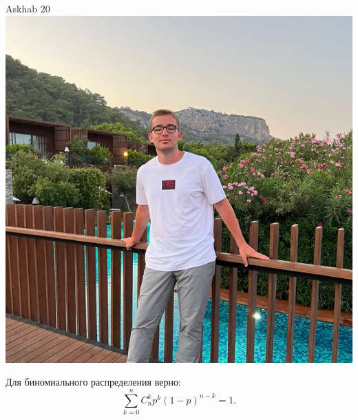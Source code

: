 \documentclass[12pt]{article}
\begin{document}
\begin{minipage}{0.45\textwidth}
\begin{tinderm}{Askhab 20}
\includegraphics[width=\textwidth]{tinder-photo/askhab.jpg}

  

\begin{mybox}
Для биномиального распределения верно: 
\[
\sum_{k=0}^{n} C_{n}^{k} p^{k} (1-p)^{n-k} = 1.
\]
\end{mybox}
\end{tinderm}
\end{minipage}
%
%
\end{document}
